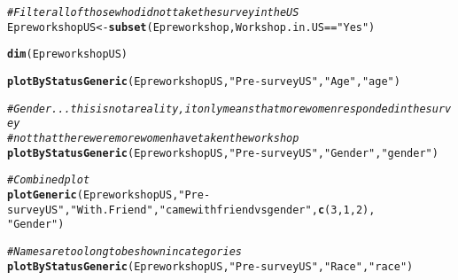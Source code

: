 \documentclass{article}\usepackage[]{graphicx}\usepackage[]{color}
\makeatletter
\newcommand{\hlnum}[1]{\textcolor[rgb]{0.686,0.059,0.569}{#1}}%
\newcommand{\hlstr}[1]{\textcolor[rgb]{0.192,0.494,0.8}{#1}}%
\newcommand{\hlcom}[1]{\textcolor[rgb]{0.678,0.584,0.686}{\textit{#1}}}%
\newcommand{\hlopt}[1]{\textcolor[rgb]{0,0,0}{#1}}%
\newcommand{\hlstd}[1]{\textcolor[rgb]{0.345,0.345,0.345}{#1}}%
\newcommand{\hlkwb}[1]{\textcolor[rgb]{0.69,0.353,0.396}{#1}}%
\newcommand{\hlkwd}[1]{\textcolor[rgb]{0.737,0.353,0.396}{\textbf{#1}}}%
\newenvironment{kframe}{%
 \def\at@end@of@kframe{}%
 \ifinner\ifhmode%
  \def\at@end@of@kframe{\end{minipage}}%
  \begin{minipage}{\columnwidth}%
 \fi\fi%
 \def\FrameCommand##1{\hskip\@totalleftmargin \hskip-\fboxsep
 \colorbox{shadecolor}{##1}\hskip-\fboxsep
     \hskip-\linewidth \hskip-\@totalleftmargin \hskip\columnwidth}%
 \MakeFramed {\advance\hsize-\width
   \@totalleftmargin\z@ \linewidth\hsize
   \@setminipage}}%
 {\par\unskip\endMakeFramed%
 \at@end@of@kframe}
\newenvironment{knitrout}{}{} %
\makeatother
\begin{document}
\begin{knitrout}
\color{fgcolor}\begin{kframe}
\begin{alltt}
\hlcom{# Filter all of those who did not take the survey in the US }
\hlstd{EpreworkshopUS} \hlkwb{<-} \hlkwd{subset}\hlstd{(Epreworkshop, Workshop.in.US} \hlopt{==} \hlstr{"Yes"}\hlstd{)}
\end{alltt}


{\ttfamily\noindent\bfseries{}}\begin{alltt}
\hlkwd{dim}\hlstd{(EpreworkshopUS)}
\end{alltt}


{\ttfamily\noindent\bfseries\color{errorcolor}{\#\# Error in eval(expr, envir, enclos): object 'EpreworkshopUS' not found}}\begin{alltt}
\hlkwd{plotByStatusGeneric}\hlstd{(EpreworkshopUS,} \hlstr{"Pre-surveyUS"}\hlstd{,} \hlstr{"Age"} \hlstd{,} \hlstr{"age"}\hlstd{)}
\end{alltt}


{\ttfamily\noindent\bfseries{}}\begin{alltt}
\hlcom{# Gender... this is not a reality, it only means that more women responded in the survey}
\hlcom{# not that there were more women have taken the workshop}
\hlkwd{plotByStatusGeneric}\hlstd{(EpreworkshopUS,} \hlstr{"Pre-surveyUS"}\hlstd{,} \hlstr{"Gender"} \hlstd{,} \hlstr{"gender"}\hlstd{)}
\end{alltt}


{\ttfamily\noindent\bfseries{}}\begin{alltt}
\hlcom{# Combined plot}
\hlkwd{plotGeneric}\hlstd{(EpreworkshopUS,} \hlstr{"Pre-surveyUS"}\hlstd{,}\hlstr{"With.Friend"} \hlstd{,} \hlstr{"came with friend vs gender"}\hlstd{,} \hlkwd{c}\hlstd{(}\hlnum{3}\hlstd{,}\hlnum{1}\hlstd{,}\hlnum{2}\hlstd{),}
            \hlstr{"Gender"} \hlstd{)}
\end{alltt}


{\ttfamily\noindent\bfseries{}}\begin{alltt}
\hlcom{# Names are too long to be shown in categories }
\hlkwd{plotByStatusGeneric}\hlstd{(EpreworkshopUS,} \hlstr{"Pre-surveyUS"}\hlstd{,} \hlstr{"Race"} \hlstd{,} \hlstr{"race"}\hlstd{)}
\end{alltt}



\end{kframe}
\end{knitrout}
\end{document}
